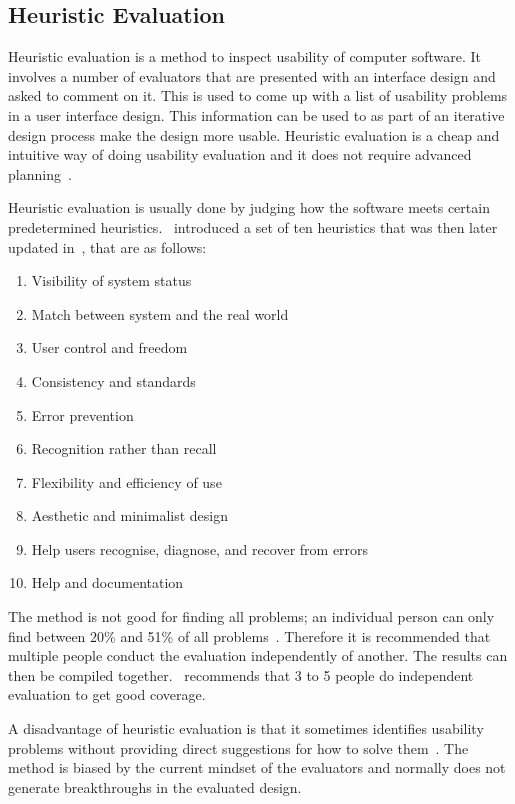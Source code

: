 \subsection{Heuristic Evaluation}
Heuristic evaluation is a method to inspect usability of computer software. It involves a number of evaluators that are presented with an interface design and asked to comment on it. This is used to come up with a list of usability problems in a user interface design. This information can be used to as part of an iterative design process make the design more usable. Heuristic evaluation is a cheap and intuitive way of doing usability evaluation and it does not require advanced planning~\cite{Nielsen1990}.

Heuristic evaluation is usually done by judging how the software meets certain predetermined heuristics.~\cite{Nielsen1990} introduced a set of ten heuristics that was then later updated in~\cite{Nielsen1994}, that are as follows:

\begin{enumerate}
  \item Visibility of system status
  \item Match between system and the real world
  \item User control and freedom
  \item Consistency and standards
  \item Error prevention
  \item Recognition rather than recall
  \item Flexibility and efficiency of use
  \item Aesthetic and minimalist design
  \item Help users recognise, diagnose, and recover from errors
  \item Help and documentation
\end{enumerate}

The method is not good for finding all problems; an individual person can only find between 20\% and 51\% of all problems~\cite{Nielsen1990}. Therefore it is recommended that multiple people conduct the evaluation independently of another. The results can then be compiled together.~\cite{Nielsen1990} recommends that 3 to 5 people do independent evaluation to get good coverage.

A disadvantage of heuristic evaluation is that it sometimes identifies usability problems without providing direct suggestions for how to solve them~\cite{Nielsen1990}. The method is biased by the current mindset of the evaluators and normally does not generate breakthroughs in the evaluated design.

